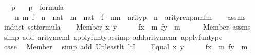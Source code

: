 \begin{isabellebody}
\ \ \ {\isachardoublequoteopen}p{\isachardoublequoteclose}\isanewline
\ \ \ {\isachardoublequoteopen}p\ {\isasymin}\ formula{\isachardoublequoteclose}\isanewline
\ \ \ {\isachardoublequoteopen}{\isasymAnd}\ n\ m\ f\ {\isachardot}{\kern0pt}\ n\ {\isasymin}\ nat\ {\isasymLongrightarrow}\ m\ {\isasymin}\ nat\ {\isasymLongrightarrow}\ f\ {\isasymin}\ n{\isasymrightarrow}m\ {\isasymLongrightarrow}\ arity{\isacharparenleft}{\kern0pt}p{\isacharparenright}{\kern0pt}\ {\isasymle}\ n\ {\isasymLongrightarrow}\ arity{\isacharparenleft}{\kern0pt}ren{\isacharparenleft}{\kern0pt}p{\isacharparenright}{\kern0pt}{\isacharbackquote}{\kern0pt}n{\isacharbackquote}{\kern0pt}m{\isacharbackquote}{\kern0pt}f{\isacharparenright}{\kern0pt}{\isasymle}m{\isachardoublequoteclose}\isanewline
%
\isadelimproof
\ \ %
\endisadelimproof
%
\isatagproof
{}\isamarkupfalse%
\ assms\isanewline
{}\isamarkupfalse%
\ {\isacharparenleft}{\kern0pt}induct\ set{\isacharcolon}{\kern0pt}formula{\isacharparenright}{\kern0pt}\isanewline
\ \ \isamarkupfalse%
\ {\isacharparenleft}{\kern0pt}Member\ x\ y{\isacharparenright}{\kern0pt}\isanewline
\ \ \isamarkupfalse%
\ \isamarkupfalse%
\ {\isachardoublequoteopen}f{\isacharbackquote}{\kern0pt}x\ {\isasymin}\ m{\isachardoublequoteclose}\ {\isachardoublequoteopen}f{\isacharbackquote}{\kern0pt}y\ {\isasymin}\ m{\isachardoublequoteclose}\isanewline
\ \ \ \ \isamarkupfalse%
\ Member\ assms\ \isamarkupfalse%
\ {\isacharparenleft}{\kern0pt}simp\ add{\isacharcolon}{\kern0pt}\ arity{\isacharunderscore}{\kern0pt}meml\ apply{\isacharunderscore}{\kern0pt}funtype{\isacharcomma}{\kern0pt}simp\ add{\isacharcolon}{\kern0pt}arity{\isacharunderscore}{\kern0pt}memr\ apply{\isacharunderscore}{\kern0pt}funtype{\isacharparenright}{\kern0pt}\isanewline
\ \ \isamarkupfalse%
\ \isamarkupfalse%
\ {\isacharquery}{\kern0pt}case\ \isamarkupfalse%
\ Member\ \isamarkupfalse%
\ {\isacharparenleft}{\kern0pt}simp\ add{\isacharcolon}{\kern0pt}\ Un{\isacharunderscore}{\kern0pt}least{\isacharunderscore}{\kern0pt}lt\ ltI{\isacharparenright}{\kern0pt}\isanewline
{}\isamarkupfalse%
\isanewline
\ \ \isamarkupfalse%
\ {\isacharparenleft}{\kern0pt}Equal\ x\ y{\isacharparenright}{\kern0pt}\isanewline
\ \ \isamarkupfalse%
\ \isamarkupfalse%
\ {\isachardoublequoteopen}f{\isacharbackquote}{\kern0pt}x\ {\isasymin}\ m{\isachardoublequoteclose}\ {\isachardoublequoteopen}f{\isacharbackquote}{\kern0pt}y\ {\isasymin}\ m{\isachardoublequoteclose}\isanewline

\end{isabellebody}
